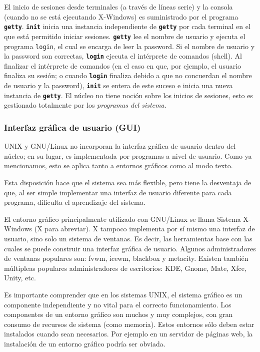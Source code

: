 \documentclass[12pt]{article}
\begin{document}
 El inicio de sesiones desde terminales (a través de líneas serie) y la
consola (cuando no se está ejecutando X-Windows) es suministrado por el 
programa \texttt{\textbf{getty}}. \texttt{\textbf{init}} inicia una 
instancia independiente de \texttt{\textbf{getty}} por cada terminal en 
el que está permitido iniciar sesiones. \texttt{\textbf{getty}} lee el
nombre de usuario y ejecuta el programa \texttt{login}, el cual se 
encarga de leer la password. Si el nombre de usuario y la password 
son correctas, \texttt{\textbf{login}} ejecuta el intérprete de comandos 
(shell).  Al finalizar el intérprete de comandos (en el caso en que, por 
ejemplo, el usuario finaliza su sesión; o cuando \texttt{\textbf{login}} 
finaliza debido a que no concuerdan el nombre de usuario y la password), 
\texttt{\textbf{init}} se entera de este suceso e inicia una nueva 
instancia de \texttt{\textbf{getty}}.
El núcleo no tiene noción sobre los inicios de sesiones, esto es gestionado
totalmente por los \textit{programas del sistema}.  

\subsubsection{Interfaz gráfica de usuario (GUI)}

 UNIX y GNU/Linux no incorporan la interfaz gráfica de usuario dentro 
del núcleo; en su lugar, es implementada por programas a nivel de usuario. 
Como ya mencionamos, esto se aplica tanto a entornos gráficos como al 
modo texto.  

Esta disposición hace que el sistema sea más flexible, pero tiene la
desventaja de que, al ser simple implementar una interfaz de usuario 
diferente para cada programa, dificulta el aprendizaje del sistema. 

 El entorno gráfico principalmente utilizado con GNU/Linux se llama
Sistema X-Windows (X para abreviar). X tampoco implementa por sí mismo una
interfaz de usuario, sino solo un sistema de ventanas. Es decir, las
herramientas base con las cuales se puede construir una interfaz gráfica de
usuario. Algunos administradores de ventanas populares son: fvwm, icewm,
blackbox y metacity. Existen también múltipleas populares administradores 
de escritorios: KDE, Gnome, Mate, Xfce, Unity, etc.  

Es importante comprender que en los sistemas UNIX, el sistema gráfico es 
un componente independiente y no vital para el correcto funcionamiento. 
Los componentes de un entorno gráfico son muchos y muy complejos, con
gran consumo de recursos de sistema (como memoria). Estos entornos sólo 
deben estar instalados cuando sean necesarios. Por ejemplo en un servidor
de páginas web, la instalación de un entorno gráfico podría ser obviada. 
\end{document}
